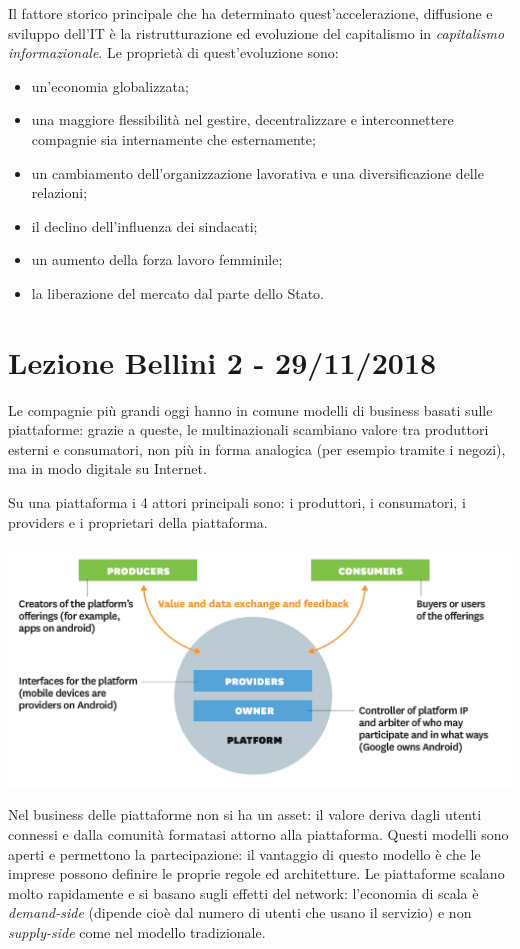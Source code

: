 \documentclass[a4page, 11pt]{article}
\begin{document}
Il fattore storico principale che ha determinato quest'accelerazione, diffusione e sviluppo dell'IT è la ristrutturazione ed evoluzione del capitalismo in \textit{capitalismo informazionale}.
Le proprietà di quest'evoluzione sono:
\begin{itemize}
  \item un'economia globalizzata;
  \item una maggiore flessibilità nel gestire, decentralizzare e interconnettere compagnie sia internamente che esternamente;
  \item un cambiamento dell'organizzazione lavorativa e una diversificazione delle relazioni;
  \item il declino dell'influenza dei sindacati;
  \item un aumento della forza lavoro femminile;
  \item la liberazione del mercato dal parte dello Stato.
\end{itemize}
  

\section*{Lezione Bellini 2 - 29/11/2018}
Le compagnie più grandi oggi hanno in comune modelli di business basati sulle piattaforme: grazie a queste, le multinazionali scambiano valore tra produttori esterni e consumatori, non più in forma analogica (per esempio tramite i negozi), ma in modo digitale su Internet.

Su una piattaforma i 4 attori principali sono: i produttori, i consumatori, i providers e i proprietari della piattaforma.
\begin{center}
	\includegraphics[scale=0.4]{image4.png}
\end{center}

Nel business delle piattaforme non si ha un asset: il valore deriva dagli utenti connessi e dalla comunità formatasi attorno alla piattaforma.
Questi modelli sono aperti e permettono la partecipazione: il vantaggio di questo modello è che le imprese possono definire le proprie regole ed architetture.
Le piattaforme scalano molto rapidamente e si basano sugli effetti del network: l'economia di scala è \textit{demand-side} (dipende cioè dal numero di utenti che usano il servizio) e non \textit{supply-side} come nel modello tradizionale.
\end{document}
